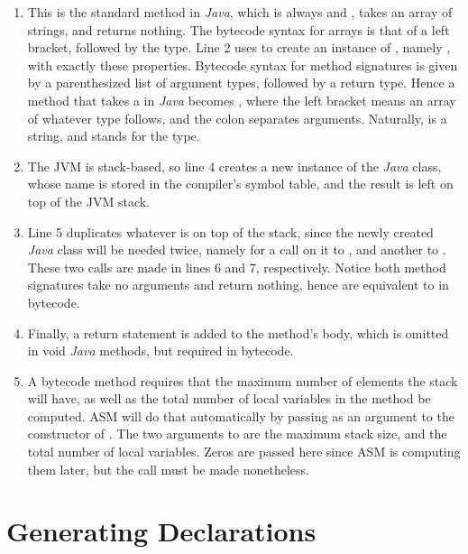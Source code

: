 \begin{enumerate}
	\addtocounter{enumi}{1}
	\item This is the standard  method in \emph{Java}, which is always  and , takes an array of strings, and returns nothing. The bytecode syntax for arrays is that of a left bracket, followed by the type. Line 2 uses  to create an instance of , namely , with exactly these properties. Bytecode syntax for method signatures is given by a parenthesized list of argument types, followed by a return type. Hence a  method that takes a  in \emph{Java} becomes \il{([Ljava/lang/String;)V}, where the left bracket means an array of whatever type follows, and the colon separates arguments. Naturally,  is a string, and  stands for the  type.
	\addtocounter{enumi}{1}
	\item The JVM is stack-based, so line 4 creates a new instance of the \emph{Java} class, whose name is stored in the compiler's symbol table, and the result is left on top of the JVM stack.
	\item Line 5 duplicates whatever is on top of the stack, since the newly created \emph{Java} class will be needed twice, namely for a call on it to , and another to . These two calls are made in lines 6 and 7, respectively. Notice both method signatures take no arguments and return nothing, hence are equivalent to  in bytecode.
	\addtocounter{enumi}{2}
	\item Finally, a return statement is added to the  method's body, which is omitted in void \emph{Java} methods, but required in bytecode.
	\item A bytecode method requires that the maximum number of elements the stack will have, as well as the total number of local variables in the method be computed. ASM will do that automatically by passing  as an argument to the constructor of . The two arguments to  are the maximum stack size, and the total number of local variables. Zeros are passed here since ASM is computing them later, but the call must be made nonetheless.
\end{enumerate}

\section{Generating Declarations}

